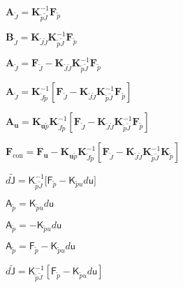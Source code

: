 \documentclass{article}
\begin{document}
$ \mathsf{\mathbf{A}}_{\widetilde{J}} = \mathsf{\mathbf{K}}^{-1}_{\widetilde{p} \widetilde{J}} \mathsf{\mathbf{F}}_{\widetilde{p}} $
\pagebreak

$ \mathsf{\mathbf{B}}_{\widetilde{J}} = \mathsf{\mathbf{K}}_{\widetilde{J} \widetilde{J}} \mathsf{\mathbf{K}}^{-1}_{\widetilde{p} \widetilde{J}} \mathsf{\mathbf{F}}_{\widetilde{p}} $
\pagebreak

$ \mathsf{\mathbf{A}}_{\widetilde{J}} = \mathsf{\mathbf{F}}_{\widetilde{J}} - \mathsf{\mathbf{K}}_{\widetilde{J} \widetilde{J}} \mathsf{\mathbf{K}}^{-1}_{\widetilde{p} \widetilde{J}} \mathsf{\mathbf{F}}_{\widetilde{p}} $
\pagebreak

$ \mathsf{\mathbf{A}}_{\widetilde{J}} = \mathsf{\mathbf{K}}^{-1}_{\widetilde{J} \widetilde{p}} [ \mathsf{\mathbf{F}}_{\widetilde{J}} - \mathsf{\mathbf{K}}_{\widetilde{J} \widetilde{J}} \mathsf{\mathbf{K}}^{-1}_{\widetilde{p} \widetilde{J}} \mathsf{\mathbf{F}}_{\widetilde{p}} ] $
\pagebreak

$ \mathsf{\mathbf{A}}_{\mathbf{u}} = \mathsf{\mathbf{K}}_{\mathbf{u} \widetilde{p}} \mathsf{\mathbf{K}}^{-1}_{\widetilde{J} \widetilde{p}} [ \mathsf{\mathbf{F}}_{\widetilde{J}} - \mathsf{\mathbf{K}}_{\widetilde{J} \widetilde{J}} \mathsf{\mathbf{K}}^{-1}_{\widetilde{p} \widetilde{J}} \mathsf{\mathbf{F}}_{\widetilde{p}} ] $
\pagebreak

$ \mathsf{\mathbf{F}}_{\text{con}} = \mathsf{\mathbf{F}}_{\mathbf{u}} - \mathsf{\mathbf{K}}_{\mathbf{u} \widetilde{p}} \mathsf{\mathbf{K}}^{-1}_{\widetilde{J} \widetilde{p}} [ \mathsf{\mathbf{F}}_{\widetilde{J}} - \mathsf{\mathbf{K}}_{\widetilde{J} \widetilde{J}} \mathsf{\mathbf{K}}^{-1}_{\widetilde{p} \widetilde{J}} \mathsf{\mathbf{K}}_{\widetilde{p}} ] $
\pagebreak

$ d \widetilde{\mathbf{\mathsf{J}}} = \mathbf{\mathsf{K}}_{\widetilde{p}\widetilde{J}}^{-1} \bigl[ \mathbf{\mathsf{F}}_{\widetilde{p}} - \mathbf{\mathsf{K}}_{\widetilde{p}u} d \mathbf{\mathsf{u}} \bigr] $
\pagebreak

$ \mathbf{\mathsf{A}}_{\widetilde{p}} = \mathbf{\mathsf{K}}_{\widetilde{p}u} d \mathbf{\mathsf{u}} $
\pagebreak

$ \mathbf{\mathsf{A}}_{\widetilde{p}} = -\mathbf{\mathsf{K}}_{\widetilde{p}u} d \mathbf{\mathsf{u}} $
\pagebreak

$ \mathbf{\mathsf{A}}_{\widetilde{p}} = \mathbf{\mathsf{F}}_{\widetilde{p}} -\mathbf{\mathsf{K}}_{\widetilde{p}u} d \mathbf{\mathsf{u}} $
\pagebreak

$ d\mathbf{\mathsf{\widetilde{J}}} = \mathbf{\mathsf{K}}^{-1}_{\widetilde{p}\widetilde{J}} [ \mathbf{\mathsf{F}}_{\widetilde{p}} -\mathbf{\mathsf{K}}_{\widetilde{p}u} d \mathbf{\mathsf{u}} ] $
\pagebreak
\end{document}
